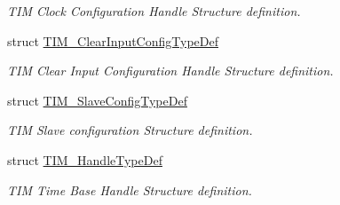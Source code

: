 \begin{DoxyCompactItemize}
\begin{DoxyCompactList}\small\item\em T\-I\-M Clock Configuration Handle Structure definition. \end{DoxyCompactList}\item 
struct \hyperlink{struct_t_i_m___clear_input_config_type_def}{T\-I\-M\-\_\-\-Clear\-Input\-Config\-Type\-Def}
\begin{DoxyCompactList}\small\item\em T\-I\-M Clear Input Configuration Handle Structure definition. \end{DoxyCompactList}\item 
struct \hyperlink{struct_t_i_m___slave_config_type_def}{T\-I\-M\-\_\-\-Slave\-Config\-Type\-Def}
\begin{DoxyCompactList}\small\item\em T\-I\-M Slave configuration Structure definition. \end{DoxyCompactList}\item 
struct \hyperlink{struct_t_i_m___handle_type_def}{T\-I\-M\-\_\-\-Handle\-Type\-Def}
\begin{DoxyCompactList}\small\item\em T\-I\-M Time Base Handle Structure definition. \end{DoxyCompactList}\end{DoxyCompactItemize}
